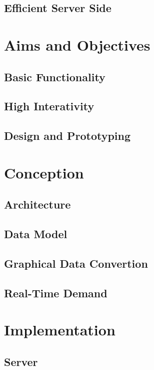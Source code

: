 \documentclass[english, BCOR=6mm, twoside=true, open=right]{tudscrreprt}
\begin{document}
\section{Efficient Server Side}


\chapter{Aims and Objectives}
\section{Basic Functionality}
\section{High Interativity}
\section{Design and Prototyping}


\chapter{Conception}
\section{Architecture}
\section{Data Model}
\section{Graphical Data Convertion}
\section{Real-Time Demand}


\chapter{Implementation}
\section{Server}
\end{document}
